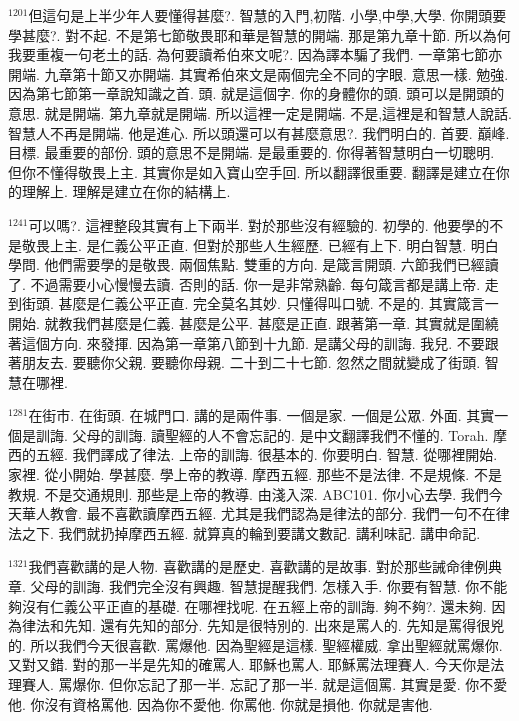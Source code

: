 \documentclass{book}
\begin{document}
$^{1201}$但這句是上半少年人要懂得甚麼?.
智慧的入門,初階.
小學,中學,大學.
你開頭要學甚麼?.
對不起.
不是第七節敬畏耶和華是智慧的開端.
那是第九章十節.
所以為何我要重複一句老土的話.
為何要讀希伯來文呢?.
因為譯本騙了我們.
一章第七節亦開端.
九章第十節又亦開端.
其實希伯來文是兩個完全不同的字眼.
意思一樣.
勉強.
因為第七節第一章說知識之首.
頭.
就是這個字.
你的身體你的頭.
頭可以是開頭的意思.
就是開端.
第九章就是開端.
所以這裡一定是開端.
不是,這裡是和智慧人說話.
智慧人不再是開端.
他是進心.
所以頭還可以有甚麼意思?.
我們明白的.
首要.
巔峰.
目標.
最重要的部份.
頭的意思不是開端.
是最重要的.
你得著智慧明白一切聰明.
但你不懂得敬畏上主.
其實你是如入寶山空手回.
所以翻譯很重要.
翻譯是建立在你的理解上.
理解是建立在你的結構上.

$^{1241}$可以嗎?.
這裡整段其實有上下兩半.
對於那些沒有經驗的.
初學的.
他要學的不是敬畏上主.
是仁義公平正直.
但對於那些人生經歷.
已經有上下.
明白智慧.
明白學問.
他們需要學的是敬畏.
兩個焦點.
雙重的方向.
是箴言開頭.
六節我們已經讀了.
不過需要小心慢慢去讀.
否則的話.
你一是非常熟齡.
每句箴言都是講上帝.
走到街頭.
甚麼是仁義公平正直.
完全莫名其妙.
只懂得叫口號.
不是的.
其實箴言一開始.
就教我們甚麼是仁義.
甚麼是公平.
甚麼是正直.
跟著第一章.
其實就是圍繞著這個方向.
來發揮.
因為第一章第八節到十九節.
是講父母的訓誨.
我兒.
不要跟著朋友去.
要聽你父親.
要聽你母親.
二十到二十七節.
忽然之間就變成了街頭.
智慧在哪裡.

$^{1281}$在街市.
在街頭.
在城門口.
講的是兩件事.
一個是家.
一個是公眾.
外面.
其實一個是訓誨.
父母的訓誨.
讀聖經的人不會忘記的.
是中文翻譯我們不懂的.
Torah.
摩西的五經.
我們譯成了律法.
上帝的訓誨.
很基本的.
你要明白.
智慧.
從哪裡開始.
家裡.
從小開始.
學甚麼.
學上帝的教導.
摩西五經.
那些不是法律.
不是規條.
不是教規.
不是交通規則.
那些是上帝的教導.
由淺入深.
ABC101.
你小心去學.
我們今天華人教會.
最不喜歡讀摩西五經.
尤其是我們認為是律法的部分.
我們一句不在律法之下.
我們就扔掉摩西五經.
就算真的輪到要講文數記.
講利味記.
講申命記.

$^{1321}$我們喜歡講的是人物.
喜歡講的是歷史.
喜歡講的是故事.
對於那些誡命律例典章.
父母的訓誨.
我們完全沒有興趣.
智慧提醒我們.
怎樣入手.
你要有智慧.
你不能夠沒有仁義公平正直的基礎.
在哪裡找呢.
在五經上帝的訓誨.
夠不夠?.
還未夠.
因為律法和先知.
還有先知的部分.
先知是很特別的.
出來是罵人的.
先知是罵得很兇的.
所以我們今天很喜歡.
罵爆他.
因為聖經是這樣.
聖經權威.
拿出聖經就罵爆你.
又對又錯.
對的那一半是先知的確罵人.
耶穌也罵人.
耶穌罵法理賽人.
今天你是法理賽人.
罵爆你.
但你忘記了那一半.
忘記了那一半.
就是這個罵.
其實是愛.
你不愛他.
你沒有資格罵他.
因為你不愛他.
你罵他.
你就是損他.
你就是害他.
\end{document}
